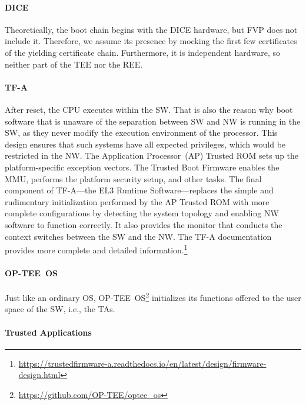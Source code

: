 


\paragraph{DICE}
Theoretically, the boot chain begins with the DICE hardware, but FVP does not include it.
Therefore, we assume its presence by mocking the first few certificates of the yielding certificate chain.
Furthermore, it is independent hardware, so neither part of the TEE nor the REE\@.

\paragraph{TF-A}
After reset, the CPU executes within the \ac{SW}.
That is also the reason why boot software that is unaware of the separation between \ac{SW} and \ac{NW} is running in the \ac{SW}, as they never modify the execution environment of the processor.
This design ensures that such systems have all expected privileges, which would be restricted in the \ac{NW}.
The Application Processor~(AP) Trusted ROM sets up the platform-specific exception vectors.
The Trusted Boot Firmware enables the MMU, performs the platform security setup, and other tasks.
The final component of TF-A---the EL3 Runtime Software---replaces the simple and rudimentary initialization performed by the AP Trusted ROM with more complete configurations by detecting the system topology and enabling \ac{NW} software to function correctly.
It also provides the monitor that conducts the context switches between the \ac{SW} and the \ac{NW}.
The TF-A documentation provides more complete and detailed information.\footnote{\url{https://trustedfirmware-a.readthedocs.io/en/latest/design/firmware-design.html}}

\paragraph{OP-TEE~OS}
Just like an ordinary OS, OP-TEE~OS\footnote{\url{https://github.com/OP-TEE/optee_os}} initializes its functions offered to the user space of the \ac{SW}, i.e., the \acp{TA}.

\paragraph{Trusted Applications}

